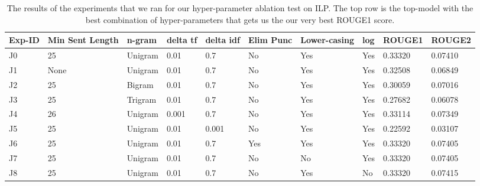 
\begin{table*}[h]
    \centering
    \begin{tabular}{|p{1cm}|p{1cm}|p{1.5cm}|p{1cm}|p{1cm}|p{1cm}|p{1cm}|p{0.7cm}|p{1.5cm}|p{1.5cm}|}
        \hline
         Exp-ID& Min Sent Length& n-gram& delta tf& delta idf& Elim Punc& Lower-casing & log & ROUGE1 & ROUGE2 \\
         \hline
        J0& 25&Unigram&0.01&0.7&No&Yes&Yes&0.33320&0.07410 \\
        J1& None&Unigram&0.01&0.7&No&Yes&Yes&0.32508&0.06849 \\
        J2& 25&Bigram&0.01&0.7&No&Yes&Yes&0.30059&0.07016 \\
        J3& 25&Trigram&0.01&0.7&No&Yes&Yes&0.27682&0.06078 \\
        J4& 26&Unigram&0.001&0.7&No&Yes&Yes&0.33114&0.07349 \\
        J5& 25&Unigram&0.01&0.001&No&Yes&Yes&0.22592&0.03107 \\
        J6& 25&Unigram&0.01&0.7&Yes&Yes&Yes&0.33320&0.07405 \\
        J7& 25&Unigram&0.01&0.7&No&No&Yes&0.33320&0.07405 \\
        J8& 25&Unigram&0.01&0.7&No&Yes&No&0.33320&0.07415 \\
        \hline
    \end{tabular}
    \caption{The results of the experiments that we ran for our hyper-parameter ablation test on ILP. The top row is the top-model with the best combination of hyper-parameters that gets us the our very best ROUGE1 score.}
    \label{ablation}
\end{table*}


